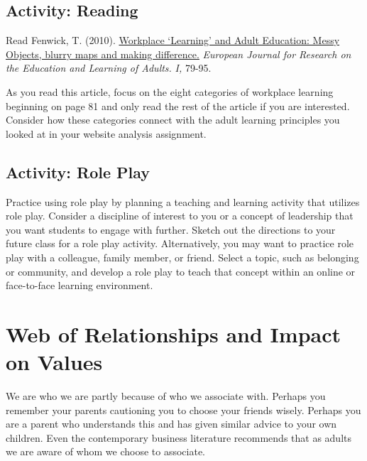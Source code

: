 \documentclass[
]{book}
\begin{document}
\hypertarget{activity-reading-1}{%
\subsection*{Activity: Reading}\label{activity-reading-1}}

\begin{reflect}
Read Fenwick, T. (2010). \href{assets/unit8/Fenwick_2010.pdf}{Workplace `Learning' and Adult Education:
Messy Objects, blurry maps and making difference.} \emph{European Journal for Research on the Education and Learning of Adults.} \emph{I,} 79-95.

As you read this article, focus on the eight categories of workplace
learning beginning on page 81 and only read the rest of the article if
you are interested. Consider how these categories connect with the adult
learning principles you looked at in your website analysis assignment.
\end{reflect}

\hypertarget{activity-role-play}{%
\subsection*{Activity: Role Play}\label{activity-role-play}}

\begin{reflect}
Practice using role play by planning a teaching and learning activity
that utilizes role play. Consider a discipline of interest to you or a
concept of leadership that you want students to engage with further.
Sketch out the directions to your future class for a role play activity.
Alternatively, you may want to practice role play with a colleague,
family member, or friend. Select a topic, such as belonging or
community, and develop a role play to teach that concept within an
online or face-to-face learning environment.
\end{reflect}

\hypertarget{web-of-relationships-and-impact-on-values}{%
\section{Web of Relationships and Impact on Values}\label{web-of-relationships-and-impact-on-values}}

We are who we are partly because of who we associate with. Perhaps you remember your parents cautioning you to choose your friends wisely. Perhaps you are a parent who understands this and has given similar advice to your own children. Even the contemporary business literature recommends that as adults we are aware of whom we choose to associate.
\end{document}

